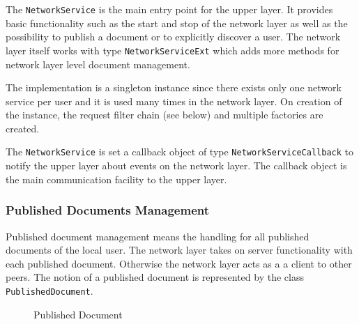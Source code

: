 The \texttt{NetworkService} is the main entry point for the upper layer. It provides basic functionality such as the start and stop of the network layer as well as the possibility to publish a document or to explicitly discover a user. The network layer itself works with type \texttt{NetworkServiceExt} which adds more methods for network layer level document management.

The implementation is a singleton instance since there exists only one network service per user and it is used many times in the network layer. On creation of the instance, the request filter chain (see below) and multiple factories are created.

The \texttt{NetworkService} is set a callback object of type \texttt{NetworkServiceCallback} to notify the upper layer about events on the network layer. The callback object is the main communication facility to the upper layer.


\subsubsection{Published Documents Management}
Published document management means the handling for all published documents of the local user. The network layer takes on server functionality with each published document. Otherwise the network layer acts as a a client to other peers. The notion of a published document is represented by the class \texttt{PublishedDocument}.

\begin{figure}[H]
 \centering
 \caption{Published Document}
 \label{fig:network.discovery.publisheddocument.uml}
\end{figure}

